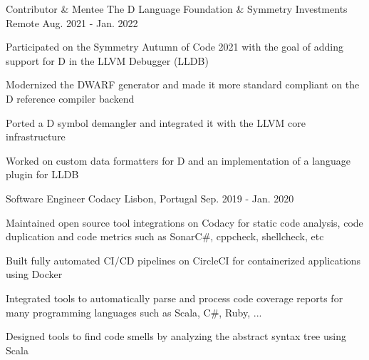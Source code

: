 

\begin{cventries}

  \cventry
    {Contributor \& Mentee} %
    {The D Language Foundation \scriptsize \& Symmetry Investments} %
    {Remote} %
    {Aug. 2021 - Jan. 2022} %
    {
      \begin{cvitems} %
        \item {Participated on the Symmetry Autumn of Code 2021 with the goal of adding support for D in the LLVM Debugger (LLDB)}
        \item {Modernized the DWARF generator and made it more standard compliant on the D reference compiler backend}
        \item {Ported a D symbol demangler and integrated it with the LLVM core infrastructure}
        \item {Worked on custom data formatters for D and an implementation of a language plugin for LLDB}
      \end{cvitems}
    }


  \cventry
    {Software Engineer} %
    {Codacy} %
    {Lisbon, Portugal} %
    {Sep. 2019 - Jan. 2020} %
    {
      \begin{cvitems} %
        \item {Maintained open source tool integrations on Codacy for static code analysis, code duplication and code metrics such as SonarC\#, cppcheck, shellcheck, etc}
        \item {Built fully automated CI/CD pipelines on CircleCI for containerized applications using Docker}
        \item {Integrated tools to automatically parse and process code coverage reports for many programming languages such as Scala, C\#, Ruby, ...}
        \item {Designed tools to find code smells by analyzing the abstract syntax tree using Scala}
      \end{cvitems}
    }


\end{cventries}
